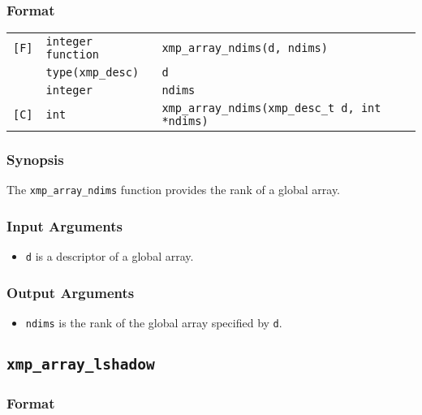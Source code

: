 \subsubsection*{Format}

\begin{tabular}{lll}

\verb![F]!& {\tt integer function}& {\tt xmp\_array\_ndims(d, ndims)}\\
          & {\tt type(xmp\_desc)} & {\tt d}\\
          & {\tt integer} & {\tt ndims}\\

\verb![C]!&  {\tt int}& {\tt xmp\_array\_ndims(xmp\_desc\_t d, int *ndims)}\\

\end{tabular}

\subsubsection*{Synopsis}

The {\tt xmp\_array\_ndims} function provides the rank of a global
array.


\subsubsection*{Input Arguments}
\begin{itemize}
 \item {\tt d} is a descriptor of a global array.
\end{itemize}

\subsubsection*{Output Arguments}
\begin{itemize}
 \item {\tt ndims} is the rank of the global array specified by {\tt d}.
\end{itemize}


\subsection{\tt xmp\_array\_lshadow}

\subsubsection*{Format}

